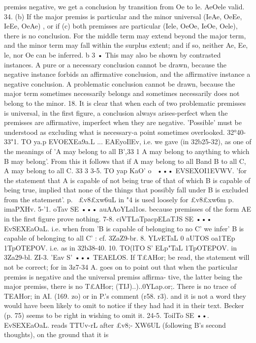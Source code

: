 {{{{{premiss negative, we get a conclusion by transition from Oe to le.
AeOele valid.
34. (b) If the major premiss is particular and the minor universal
(IeAe, OeEe, IeEe, OeAe) , or if (c) both premisses are particular
(Iele, OeOe, IeOe, Oele), there is no conclusion. For the middle
term may extend beyond the major term, and the minor term
may fall within the surplus extent; and if so, neither Ae, Ee, le,
nor Oe can be inferred.
b 3 • This may also be shown by contrasted instances. A pure or
a necessary conclusion cannot be drawn, because the negative
instance forbids an affirmative conclusion, and the affirmative
instance a negative conclusion. A problematic conclusion cannot
be drawn, because the major term sometimes necessarily belongs
and sometimes necessarily does not belong to the minor.
18. It is clear that when each of two problematic premisses is
universal, in the first figure, a conclusion always arises-perfect
when the premisses are affirmative, imperfect when they are
negative. 'Possible' must be understood as excluding what is
necessary-a point sometimes overlooked.
32°40-33"1. TO ya.p EVOEXEa9a.L ... EAEyoIlEv, i.e. we gave (in
32b25-32), as one of the meanings of 'A may belong to all B',33 1
A may belong to anything to which B may belong'. From this
it follows that if A may belong to all Band B to all C, A may
belong to all C.
33 3 3-5. TO yap KaO' o~ ••• EVSEXOI1EVWV. 'for the statement
that A is capable of not being true of that of which B is capable
of being true, implied that none of the things that possibly fall
under B is excluded from the statement'. p.~ £v8£xw6uL in "4 is
used loosely for £v8£xw6m p.~ imaPXHv.
5-'1. oTav SE ••• auAAoYLal1os. because premisses of the form
AE in the first figure prove nothing.
7-8. ciVTLaTpacpELaTJS SE ••• EvSEXEaOaL. i.e. when from 'B is
capable of belonging to no C' we infer' B is capable of belonging
to all C' : cf. 3ZaZ9-br.
8. YLvETaL 0 aUTOS oa1TEp 1TpOTEPOV. i.e. as in 32b38-40.
10. TO(lTO S' ELp"TaL 1TpOTEPOV. in 3Za29-bl.
ZI-3. 'Eav S' ••• TEAELOS. If T£AHor; be read, the statement will
not be correct; for in 3z7-34 A. goes on to point out that when the
particular premiss is negative and the universal premiss affirma-
tive, the latter being the major premiss, there is no T£AHor;
(TIJ)..)..0YLap.or;. There is no trace of TEAHor; in AI. (169. zo) or in
P.'s comment (r58. r3). and it is not a word they would have been
likely to omit to notice if they had had it in their text. Becker
(p. 75) seems to be right in wishing to omit it.
24-5. ToilTo SE ••. EvSEXEaOaL. \Vaitz reads TTUv-rL after £v8;-
XW6UL (following B's second thoughts), on the ground that it is
}}}}}
